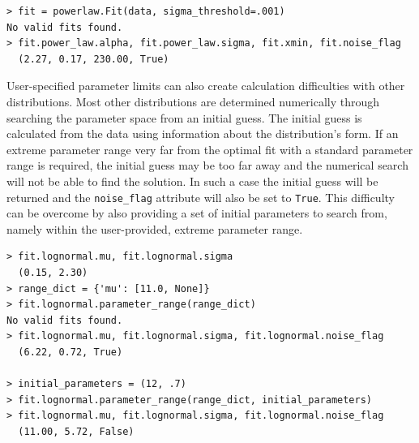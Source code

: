 \documentclass[10pt]{article}
\begin{document}
\begin{verbatim}
> fit = powerlaw.Fit(data, sigma_threshold=.001)
No valid fits found.
> fit.power_law.alpha, fit.power_law.sigma, fit.xmin, fit.noise_flag
  (2.27, 0.17, 230.00, True)
\end{verbatim}

User-specified parameter limits can also create calculation difficulties with other distributions. Most other distributions are determined numerically through searching the parameter space from an initial guess. The initial guess is calculated from the data using information about the distribution's form. If an extreme parameter range very far from the optimal fit with a standard parameter range is required, the initial guess may be too far away and the numerical search will not be able to find the solution. In such a case the initial guess will be returned and the \verb$noise_flag$ attribute will also be set to \verb$True$. This difficulty can be overcome by also providing a set of initial parameters to search from, namely within the user-provided, extreme parameter range. 

\begin{verbatim}
> fit.lognormal.mu, fit.lognormal.sigma
  (0.15, 2.30)
> range_dict = {'mu': [11.0, None]}
> fit.lognormal.parameter_range(range_dict)
No valid fits found.
> fit.lognormal.mu, fit.lognormal.sigma, fit.lognormal.noise_flag
  (6.22, 0.72, True)

> initial_parameters = (12, .7)
> fit.lognormal.parameter_range(range_dict, initial_parameters)
> fit.lognormal.mu, fit.lognormal.sigma, fit.lognormal.noise_flag
  (11.00, 5.72, False)
\end{verbatim}


%
\end{document}
